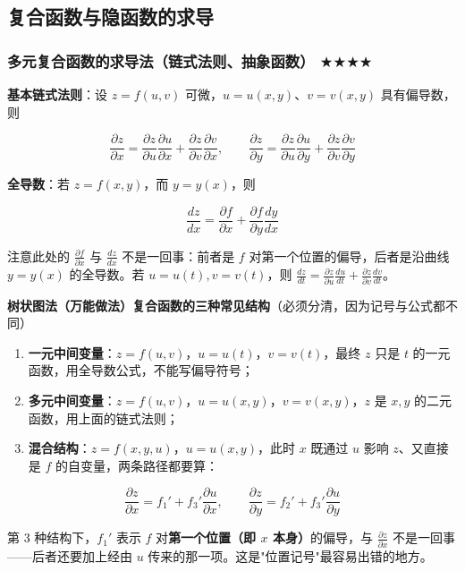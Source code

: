 \documentclass[11pt,openany,UTF8]{ctexbook}
\begin{document}
\subsection{复合函数与隐函数的求导}

\subsubsection{多元复合函数的求导法（链式法则、抽象函数） $\bigstar$$\bigstar$$\bigstar$$\bigstar$}

\textbf{基本链式法则}：设 $z=f(u,v)$ 可微，$u=u(x,y)$、$v=v(x,y)$ 具有偏导数，则

\[\frac{\partial z}{\partial x}=\frac{\partial z}{\partial u}\frac{\partial u}{\partial x}+\frac{\partial z}{\partial v}\frac{\partial v}{\partial x},\qquad \frac{\partial z}{\partial y}=\frac{\partial z}{\partial u}\frac{\partial u}{\partial y}+\frac{\partial z}{\partial v}\frac{\partial v}{\partial y}\]

\textbf{全导数}：若 $z=f(x,y)$，而 $y=y(x)$，则

\[\frac{dz}{dx}=\frac{\partial f}{\partial x}+\frac{\partial f}{\partial y}\frac{dy}{dx}\]

注意此处的 $\frac{\partial f}{\partial x}$ 与 $\frac{dz}{dx}$ 不是一回事：前者是 $f$ 对第一个位置的偏导，后者是沿曲线 $y=y(x)$ 的全导数。若 $u=u(t),v=v(t)$，则 $\frac{dz}{dt}=\frac{\partial z}{\partial u}\frac{du}{dt}+\frac{\partial z}{\partial v}\frac{dv}{dt}$。

\textbf{树状图法（万能做法）}\textbf{复合函数的三种常见结构}（必须分清，因为记号与公式都不同）

\begin{enumerate}
\item \textbf{一元中间变量}：$z=f(u,v)$，$u=u(t)$，$v=v(t)$，最终 $z$ 只是 $t$ 的一元函数，用全导数公式，不能写偏导符号；
\item \textbf{多元中间变量}：$z=f(u,v)$，$u=u(x,y)$，$v=v(x,y)$，$z$ 是 $x,y$ 的二元函数，用上面的链式法则；
\item \textbf{混合结构}：$z=f(x,y,u)$，$u=u(x,y)$，此时 $x$ 既通过 $u$ 影响 $z$、又直接是 $f$ 的自变量，两条路径都要算：
\end{enumerate}
\[\frac{\partial z}{\partial x}=f_1'+f_3'\frac{\partial u}{\partial x},\qquad \frac{\partial z}{\partial y}=f_2'+f_3'\frac{\partial u}{\partial y}\]

第 3 种结构下，$f_1'$ 表示 $f$ 对\textbf{第一个位置（即 $x$ 本身）}的偏导，与 $\frac{\partial z}{\partial x}$ 不是一回事——后者还要加上经由 $u$ 传来的那一项。这是"位置记号"最容易出错的地方。
\end{document}
